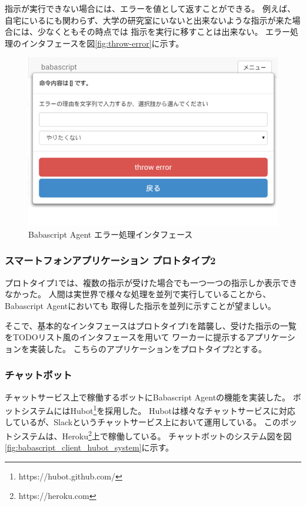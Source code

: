 指示が実行できない場合には、エラーを値として返すことができる。
例えば、自宅にいるにも関わらず、大学の研究室にいないと出来ないような指示が来た場合には、少なくともその時点では
指示を実行に移すことは出来ない。
エラー処理のインタフェースを図\ref{fig:throw-error}に示す。

\begin{figure}[htbp]
  \begin{center}
  \includegraphics[width=.5\linewidth,bb=0 0 768 518]{images/throw-error.png}
  \end{center}
  \caption{Babascript Agent エラー処理インタフェース}
  \label{fig:error}
\end{figure}

\subsubsection{スマートフォンアプリケーション
プロトタイプ2}\label{ux30b9ux30deux30fcux30c8ux30d5ux30a9ux30f3ux30a2ux30d7ux30eaux30b1ux30fcux30b7ux30e7ux30f3-ux30d7ux30edux30c8ux30bfux30a4ux30d72}

プロトタイプ1では、複数の指示が受けた場合でも一つ一つの指示しか表示できなかった。
人間は実世界で様々な処理を並列で実行していることから、Babascript
Agentにおいても 取得した指示を並列に示すことが望ましい。

そこで、基本的なインタフェースはプロトタイプ1を踏襲し、受けた指示の一覧をTODOリスト風のインタフェースを用いて
ワーカーに提示するアプリケーションを実装した。
こちらのアプリケーションをプロトタイプ2とする。

\subsubsection{チャットボット}\label{ux30c1ux30e3ux30c3ux30c8ux30dcux30c3ux30c8}

チャットサービス上で稼働するボットにBabascript Agentの機能を実装した。
ボットシステムにはHubot\footnote{https://hubot.github.com/}を採用した。
Hubotは様々なチャットサービスに対応しているが、Slackというチャットサービス上において運用している。
このボットシステムは、Heroku\footnote{https://heroku.com}上で稼働している。
チャットボットのシステム図を図\ref{fig:babascript_client_hubot_system}に示す。

